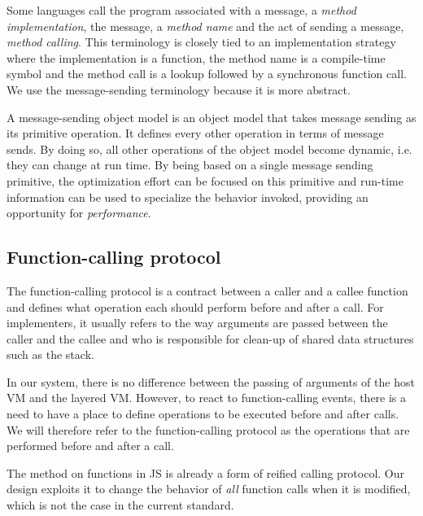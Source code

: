 Some languages call the program associated with a message, a \textit{method
implementation}, the message, a \textit{method name} and the act of sending a
message, \textit{method calling}. This terminology is closely tied to an
implementation strategy where the implementation is a function, the method name
is a compile-time symbol and the method call is a lookup followed by a
synchronous function call. We use the message-sending terminology because it is
more abstract. 

A message-sending object model is an object model that takes message sending as
its primitive operation. It defines every other operation in terms of message
sends. By doing so, all other operations of the object model become dynamic,
i.e. they can change at run time. By being based on a single message sending
primitive, the optimization effort can be focused on this primitive and
run-time information can be used to specialize the behavior invoked, providing
an opportunity for \textit{performance}. 

\subsection{Function-calling protocol}

The function-calling protocol is a contract between a caller and a callee
function and defines what operation each should perform before and after a
call. For implementers, it usually refers to the way arguments are
passed between the caller and the callee and who is responsible for clean-up of
shared data structures such as the stack.

In our system, there is no difference between the passing of arguments of the
host VM and the layered VM. However, to react to function-calling events, there
is a need to have a place to define operations to be executed before and after
calls. We will therefore refer to the function-calling protocol as the
operations that are performed before and after a call. 

The  method on functions in JS is already a form of reified calling
protocol. Our design exploits it to change the behavior of \textit{all} function
calls when it is modified, which is not the case in the current standard.

